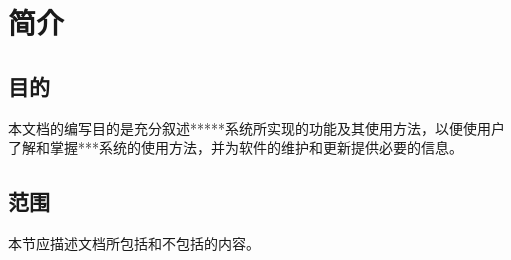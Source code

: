 \chapter{简介}
\section{目的}
本文档的编写目的是充分叙述*****系统所实现的功能及其使用方法，以便使用户了解和掌握***系统的使用方法，并为软件的维护和更新提供必要的信息。

\section{范围}
本节应描述文档所包括和不包括的内容。
